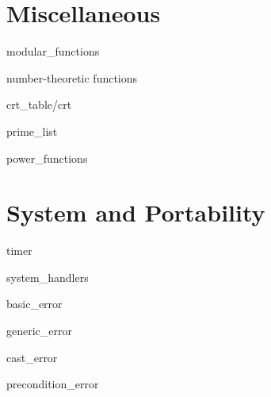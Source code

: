 \chapter{Miscellaneous}

\begin{class}{modular_functions}
  
\end{class}

\begin{class}{number-theoretic functions}
  
\end{class}

\begin{class}{crt_table/crt}
  
\end{class}

\begin{class}{prime_list}
  
\end{class}

\begin{class}{power_functions}
  
\end{class}


\chapter{System and Portability}

\begin{class}{timer}
  
\end{class}

\begin{class}{system_handlers}
  
\end{class}

\begin{class}{basic_error}
  
\end{class}

\begin{class}{generic_error}
  
\end{class}

\begin{class}{cast_error}
  
\end{class}

\begin{class}{precondition_error}
  
\end{class}

